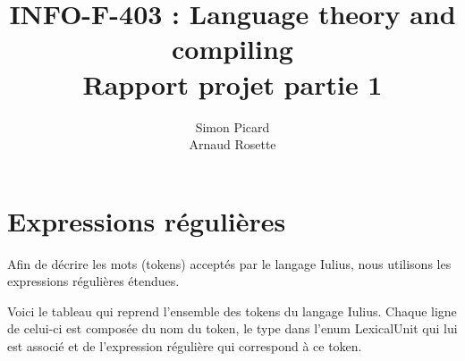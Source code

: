 \documentclass[a4paper,10pt]{article}
\title{INFO-F-403 : Language theory and compiling \\ Rapport projet partie 1}
\author{Simon Picard \\ Arnaud Rosette}
\begin{document}
\maketitle


\section{Expressions régulières}

Afin de décrire les mots (tokens) acceptés par le langage Iulius, nous utilisons les expressions régulières étendues.

Voici le tableau qui reprend l'ensemble des tokens du langage Iulius. Chaque ligne de celui-ci est composée du nom du token, le type dans l'enum LexicalUnit qui lui est associé et de l'expression régulière qui correspond à ce token.\\
\end{document}
